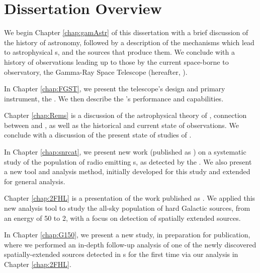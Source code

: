\chapter{Dissertation Overview}
\label{chap:intro}

We begin Chapter \ref{chap:gamAstr} of this dissertation with a brief discussion of the history of \gam{} astronomy, followed by a description of the mechanisms which lead to astrophysical \gam{}s, and the sources that produce them. We conclude with a history of \gam{} observations leading up to those by the current space-borne\mev{} to \tev{} \gam{} observatory, the \Fermi{} Gamma-Ray Space Telescope (hereafter, \Fermi{}).

In Chapter \ref{chap:FGST}, we present the \Fermi{} telescope's design and primary instrument, the \lat{}. We then describe the \lat{}'s performance and capabilities. 

Chapter \ref{chap:Rems} is a discussion of the  astrophysical theory of \snrs{}, connection between \snrs{} and \crs{}, as well as the historical and current state of \snr{} observations. We conclude with a discussion of the present state of \gam{} studies of \snrs{}.

In Chapter \ref{chap:snrcat}, we present new work (published as \cite{snrCat}) on a systematic study of the population of radio \snrs{} emitting\gev{} \gam{}s, as detected by the \lat{}. We also present a new tool and analysis method, initially developed for this study and extended for general \lat{} analysis.

Chapter \ref{chap:2FHL} is a presentation of the  work published as \cite{2FHL}. We applied this new analysis tool to study the all-sky population of hard Galactic \gam{} sources, from an energy of 50\gev{} to 2\tev{}, with a focus on detection of spatially extended sources.

In Chapter \ref{chap:G150}, we present a new study, in preparation for publication, where we performed an in-depth follow-up analysis of one of the newly discovered spatially-extended sources detected in \gam{}s for the first time via our analysis in Chapter \ref{chap:2FHL}. 




